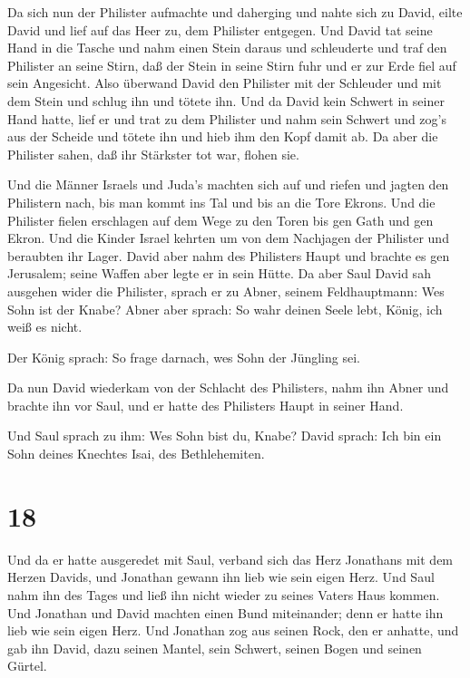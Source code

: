  Da sich nun der Philister aufmachte und daherging und
nahte sich zu David, eilte David und lief auf das Heer zu, dem Philister
entgegen.  Und David tat seine Hand in die Tasche und nahm
einen Stein daraus und schleuderte und traf den Philister an seine
Stirn, daß der Stein in seine Stirn fuhr und er zur Erde fiel auf sein
Angesicht.  Also überwand David den Philister mit der
Schleuder und mit dem Stein und schlug ihn und tötete ihn. Und da David
kein Schwert in seiner Hand hatte,  lief er und trat zu dem
Philister und nahm sein Schwert und zog's aus der Scheide und tötete ihn
und hieb ihm den Kopf damit ab. Da aber die Philister sahen, daß ihr
Stärkster tot war, flohen sie.

 Und die Männer Israels und Juda's machten sich auf und
riefen und jagten den Philistern nach, bis man kommt ins Tal und bis an
die Tore Ekrons. Und die Philister fielen erschlagen auf dem Wege zu den
Toren bis gen Gath und gen Ekron.  Und die Kinder Israel
kehrten um von dem Nachjagen der Philister und beraubten ihr Lager.
 David aber nahm des Philisters Haupt und brachte es gen
Jerusalem; seine Waffen aber legte er in sein Hütte.  Da
aber Saul David sah ausgehen wider die Philister, sprach er zu Abner,
seinem Feldhauptmann: Wes Sohn ist der Knabe? Abner aber sprach: So wahr
deinen Seele lebt, König, ich weiß es nicht.

 Der König sprach: So frage darnach, wes Sohn der Jüngling
sei.

 Da nun David wiederkam von der Schlacht des Philisters,
nahm ihn Abner und brachte ihn vor Saul, und er hatte des Philisters
Haupt in seiner Hand.

 Und Saul sprach zu ihm: Wes Sohn bist du, Knabe? David
sprach: Ich bin ein Sohn deines Knechtes Isai, des Bethlehemiten.

\hypertarget{section-17}{%
\section{18}\label{section-17}}

 Und da er hatte ausgeredet mit Saul, verband sich das Herz
Jonathans mit dem Herzen Davids, und Jonathan gewann ihn lieb wie sein
eigen Herz.  Und Saul nahm ihn des Tages und ließ ihn nicht
wieder zu seines Vaters Haus kommen.  Und Jonathan und David
machten einen Bund miteinander; denn er hatte ihn lieb wie sein eigen
Herz.  Und Jonathan zog aus seinen Rock, den er anhatte, und
gab ihn David, dazu seinen Mantel, sein Schwert, seinen Bogen und seinen
Gürtel.

